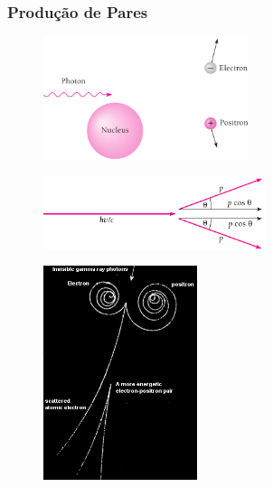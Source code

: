 \documentclass[12pt,brazil]{beamer}
\begin{document}
\begin{frame}
  \frametitle{Produção de Pares}
  

  \begin{multicols}{2}
    \begin{minipage}[b][20ex][t]{\linewidth}
    \vspace*{0.25cm}
      \begin{figure}
        \includegraphics[width=6.0cm]{figuras/fig21}
      \end{figure}
    \end{minipage}

    \begin{minipage}[b][20ex][t]{\linewidth}    
    \vspace*{-0.5cm}
      \begin{figure}
        \includegraphics[width=6.5cm]{figuras/fig23}
      \end{figure}
      \fontsize{8pt}{11pt}\selectfont
      
    \end{minipage}

    \begin{minipage}[b][40ex][t]{\linewidth}
    
      \begin{figure}
        \hspace*{.5cm}\includegraphics[width=4.5cm]{figuras/fig22}
      \end{figure}
      
    \end{minipage}
  \end{multicols} 
  
\end{frame}
\end{document}

